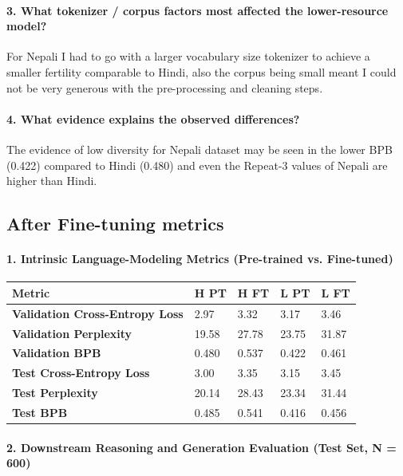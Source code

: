 \documentclass[10pt,a4paper]{article}
\begin{document}
\paragraph{3. What tokenizer / corpus factors most affected the lower-resource model?}
For Nepali I had to go with a larger vocabulary size tokenizer to achieve a smaller fertility comparable to Hindi, also the corpus being small meant I could not be very generous with the pre-processing and cleaning steps.

\paragraph{4. What evidence explains the observed differences?}
The evidence of low diversity for Nepali dataset may be seen in the lower BPB (0.422) compared to Hindi (0.480) and even the Repeat-3 values of Nepali are higher than Hindi.

\subsection{After Fine-tuning metrics}

\paragraph{1. Intrinsic Language-Modeling Metrics (Pre-trained vs. Fine-tuned)}

\begin{center}
\small
\begin{longtable}{l l l l l}
\toprule
Metric & H PT &  H FT &  L PT &  L FT \\
\midrule
\endhead
\textbf{Validation Cross-Entropy Loss} & 2.97 & 3.32 & 3.17 & 3.46 \\
\textbf{Validation Perplexity} & 19.58 & 27.78 & 23.75 & 31.87 \\
\textbf{Validation BPB} & 0.480 & 0.537 & 0.422 & 0.461 \\
\textbf{Test Cross-Entropy Loss} & 3.00 & 3.35 & 3.15 & 3.45 \\
\textbf{Test Perplexity} & 20.14 & 28.43 & 23.34 & 31.44 \\
\textbf{Test BPB} & 0.485 & 0.541 & 0.416 & 0.456 \\
\bottomrule
\end{longtable}
\end{center}

\paragraph{2. Downstream Reasoning and Generation Evaluation (Test Set, N = 600)}
\end{document}
